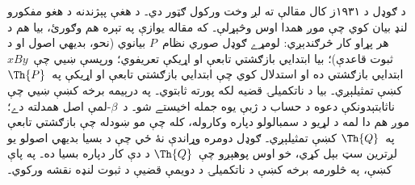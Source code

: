 \documentclass[../../../include/open-logic-section]{subfiles}
\begin{document}


د ګوډل د ۱۹۳۱ز کال مقالې ته لږ وخت ورکول ګټور دي۔ د هغې پېژندنه
د هغو مفکورو لنډ بيان کوي چې موږ همدا اوس وڅېړلې۔ که مقاله يوازې
په تېره هم وګورئ، بيا هم د هر پړاو کار څرګندېږي: لومړے ګوډل صوري
نظام~$P$ بيانوي (نحو، بديهي اصول او د ثبوت قاعدې)؛ بيا ابتدايي
بازګشتي تابعې او اړيکې تعريفوي؛ ورپسې ښيي چې~$x B y$ ابتدايي
بازګشتي ده او استدلال کوي چې ابتدايي بازګشتي تابعې او اړيکې
په~$\Th{P}$ کښې تمثيلېږي۔ بيا د ناتکميلۍ قضيه لکه پورته ثابتوي۔
په درېيمه برخه کښې ښيي چې ناثابتېدونکې دعوه د حساب د ژبې يوه جمله
اخيستے شو۔ د~$\beta$-لمې اصل همدلته دے؛ موږ هم دا لمه د لړيو
د سمبالولو دپاره وکاروله، کله چې مو ښودله چې بازګشتي تابعې
په~$\Th{Q}$ کښې تمثيلېږي۔ ګوډل دومره وړاندې نۀ ځي چې د بسيا
بديهي اصولو يو لږترين سټ بېل کړي، خو اوس پوهېږو چې~$\Th{Q}$ د
دې کار دپاره بسيا ده۔ په پاې کښې، په څلورمه برخه کښې د ناتکميلۍ
د دويمې قضيې د ثبوت لنډه نقشه ورکوي۔
\end{document}
